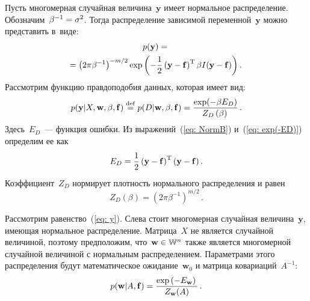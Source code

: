 \begin{multicols}{2}
Пусть многомерная случайная величина~$\mathbf{y}$ имеет нормальное распределение. 
Обозначим~$\beta^{-1}\hm=\sigma^{2}$. Тогда распределение зависимой переменной~$\mathbf{y}$ 
можно представить в~виде:
\begin{multline}
\label {eq: NormB}
p(\mathbf{y})={}\\
\hspace*{-2mm}{}=\left(2\pi\beta^{-1}\right)^{-{m}/{2}}
\exp\left(-\fr{1}{2}\left(\mathbf{y}-\mathbf{f}\right)^{\mathrm{T}}\beta 
I(\mathbf{y}-\mathbf{f})\right).\!
\end{multline}
Рассмотрим функцию правдоподобия данных, которая имеет вид:
\begin{equation}
\label {eq: exp(-ED)}
p(\mathbf{y}|X,\mathbf{w},\beta,\mathbf{f})\mathrel{\stackrel{\mathrm{def}}{=}}p(D|\mathbf{w},\beta,
\mathbf{f})=\displaystyle\frac{\displaystyle \exp(-\beta E_D)\mathstrut}{\displaystyle Z_{D}\left(\beta\right)\mathstrut}\,.
\end{equation}
Здесь~$E_D$~--- функция ошибки. Из выражений~(\ref{eq: NormB}) и~(\ref{eq: exp(-ED)}) 
определим ее как
$$
E_D=\displaystyle\frac{\displaystyle 1\mathstrut}{\displaystyle 2\mathstrut}\left(\mathbf{y}-\mathbf{f}\right)^{\mathrm{T}}(\mathbf{y}-\mathbf{f})\,.
$$
Коэффициент~$Z_D$ нормирует плотность нормального распределения и равен
\begin{equation}
\label {eq: ZD}
Z_{D}(\beta)=(2\pi\beta^{-1})^{{m}/{2}}\,.
\end{equation}

Рассмотрим равенство~(\ref{eq: y}). Слева стоит многомерная случайная величина~$\mathbf{y}$, 
име\-ющая нормальное распределение. Матрица~$X$ не является случайной величиной, 
поэтому предположим, что~$\mathbf{w} \hm\in \mathbb{W}^n$ также является многомерной 
случайной величиной с нормальным распределением. Параметрами этого распределения 
будут математическое ожидание~$\mathbf{w}_0$ и матрица ковариаций~$A^{-1}$:
\begin{equation}
\label {eq: exp(-Ew)}
p(\mathbf{w}|A,\mathbf{f})=\displaystyle\frac{\displaystyle \exp\left(-E_{\mathbf{w}}\right)\mathstrut}{\displaystyle Z_{\mathbf{w}}(A)\mathstrut}\,.
\end{equation}


\end{multicols}
